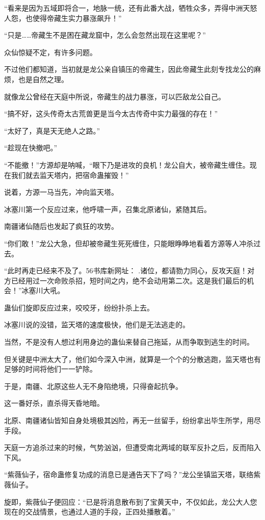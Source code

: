 \begin{this_body}
“看来是因为五域即将合一，地脉一统，还有此番大战，牺牲众多，弄得中洲天怒人怨，也使得帝藏生实力暴涨飙升！”

“只是……帝藏生不是困在藏龙窟中，怎么会忽然出现在这里呢？”

众仙惊疑不定，有许多问题。

不过他们都知道，当初就是龙公亲自镇压的帝藏生，因此帝藏生此刻专找龙公的麻烦，也是自然之理。

就像龙公曾经在天庭中所说，帝藏生的战力暴涨，可以匹敌龙公自己。

“搞不好，这头传奇太古荒兽更是当今太古传奇中实力最强的存在！”

“太好了，真是天无绝人之路。”

“趁现在快撤吧。”

“不能撤！”方源却是呐喊，“眼下乃是进攻的良机！龙公自大，被帝藏生缠住。现在我们就去监天塔内，把宿命蛊摧毁！”

说着，方源一马当先，冲向监天塔。

冰塞川第一个反应过来，他呼啸一声，召集北原诸仙，紧随其后。

南疆诸仙随后也发起了疯狂的攻势。

“你们敢！”龙公大急，但却被帝藏生死死缠住，只能眼睁睁地看着方源等人冲杀过去。

“此时再走已经来不及了。56书库新网址： .诸位，都请勠力同心，反攻天庭！对方已经用过一次命败杀招，短时间之内，绝不会动用第二次。这是我们最后的机会！”冰塞川大吼。

蛊仙们旋即反应过来，咬咬牙，纷纷扑杀上去。

冰塞川说的没错，监天塔的速度极快，他们是无法逃走的。

当然，不是没有人想过利用身边的蛊仙来替自己拖延，从而争取到逃生的时间。

但关键是中洲太大了，他们如今深入中洲，就算是一个个的分散逃跑，监天塔也有足够的时间将他们一一铲除。

于是，南疆、北原这些人无不身陷绝境，只得奋起抗争。

这一番好杀，直杀得天昏地暗。

北原、南疆诸仙皆知自身处境极其凶险，再无一丝留手，纷纷拿出毕生所学，用尽手段。

天庭一方追杀过来的时候，气势汹汹，但遭受南北两域的联军反扑之后，反而陷入下风。

“紫薇仙子，宿命蛊修复功成的消息已是通告天下了吗？”龙公坐镇监天塔，联络紫薇仙子。

旋即，紫薇仙子便回应：“已是将消息散布到了宝黄天中，不仅如此，龙公大人您现在的交战情景，也通过人道的手段，正四处播散着。”


\end{this_body}
